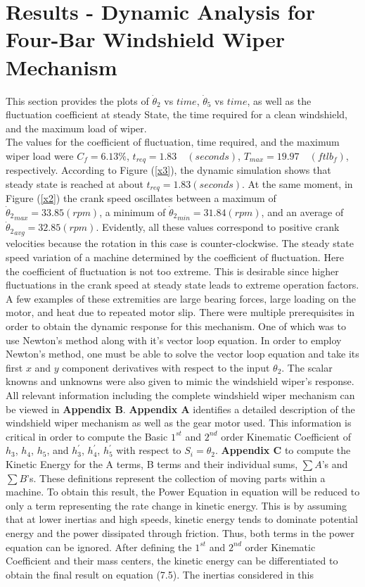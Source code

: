 \documentclass[12pt]{article}
\begin{document}
\section*{Results - Dynamic Analysis for Four-Bar Windshield Wiper Mechanism}
\begin{doublespace}
This section provides the plots of $\dot{\theta}_{2}$ vs $time$, $\dot{\theta}_{5}$ vs $time$, as well as the fluctuation coefficient at steady State, the time required for a clean windshield, and the maximum load of wiper. \\ 
\indent
The values for the coefficient of fluctuation, time required, and the maximum wiper load were $C_{f} = 6.13 \%$, $t_{req} = 1.83 \quad (seconds)$, $T_{max} = 19.97 \quad (ft lb_{f})$, respectively. According to Figure (\ref{x3}), the dynamic simulation shows that steady state is reached at about $t_{req} = 1.83 (seconds)$. At the same moment, in Figure (\ref{x2}) the crank speed oscillates between a maximum of ${{}\dot{\theta}_{2}}_{max} = 33.85 (rpm)$, a minimum of ${{}\dot{\theta}_{2}}_{min} = 31.84 (rpm)$, and an average of ${{}\dot{\theta}_{2}}_{avg} = 32.85 (rpm)$. Evidently, all these values correspond to positive crank velocities because the rotation in this case is counter-clockwise. The steady state speed variation of a machine determined by the coefficient of fluctuation. Here the coefficient of fluctuation is not too extreme. This is desirable since higher fluctuations in the crank speed at steady state leads to extreme operation factors. A few examples of these extremities are large bearing forces, large loading on the motor, and heat due to repeated motor slip. There were multiple prerequisites in order to obtain the dynamic response for this mechanism. One of which was to use Newton's method along with it's vector loop equation. In order to employ Newton's method, one must be able to solve the vector loop equation and take its first $x$ and $y$ component derivatives with respect to the input $\theta_{2}$. The scalar knowns and unknowns were also given to mimic the windshield wiper's response. All relevant information including the complete windshield wiper mechanism can be viewed in {\bf Appendix B}. {\bf Appendix A} identifies a detailed description of the windshield wiper mechanism as well as the gear motor used. This information is critical in order to compute the Basic $1^{st}$ and $2^{nd}$ order Kinematic Coefficient of $h_{3}$, $h_{4}$, $h_{5}$, and $h^{\prime}_{3}$, $h^{\prime}_{4}$, $h^{\prime}_{5}$ with respect to $S_{i} = \theta_{2}$. {\bf Appendix C} to compute the Kinetic Energy for the A terms, B terms and their individual sums, $\sum A$'s and $\sum B$'s. These definitions represent the collection of moving parts within a machine. To obtain this result, the Power Equation in equation will be reduced to only a term representing the rate change in kinetic energy. This is by assuming that at lower inertias and high speeds, kinetic energy tends to dominate potential energy and the power dissipated through friction. Thus, both terms in the power equation can be ignored. After defining the $1^{st}$ and $2^{nd}$ order Kinematic Coefficient and their mass centers, the kinetic energy can be differentiated to obtain the final result on equation (7.5). The inertias considered in this 
\end{doublespace}
\end{document}

